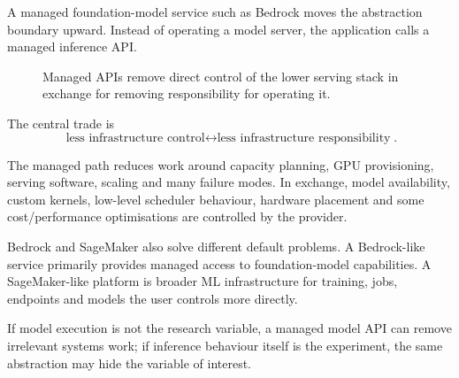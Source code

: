 A managed foundation-model service such as Bedrock moves the abstraction boundary upward.
Instead of operating a model server, the application calls a managed inference API.

\begin{figure}[ht]
\centering
{}
\caption{Managed APIs remove direct control of the lower serving stack in exchange for removing responsibility for operating it.}
\label{fig:managed-boundary}
\end{figure}

The central trade is
\[
\boxed{
\text{less infrastructure control}
\leftrightarrow
\text{less infrastructure responsibility}
}.
\]

The managed path reduces work around capacity planning, GPU provisioning, serving software, scaling and many failure modes.
In exchange, model availability, custom kernels, low-level scheduler behaviour, hardware placement and some cost/performance optimisations are controlled by the provider.

Bedrock and SageMaker also solve different default problems.
A Bedrock-like service primarily provides managed access to foundation-model capabilities.
A SageMaker-like platform is broader ML infrastructure for training, jobs, endpoints and models the user controls more directly.

\begin{calloutinductivebias}
If model execution is not the research variable, a managed model API can remove irrelevant systems work; if inference behaviour itself is the experiment, the same abstraction may hide the variable of interest.
\end{calloutinductivebias}


